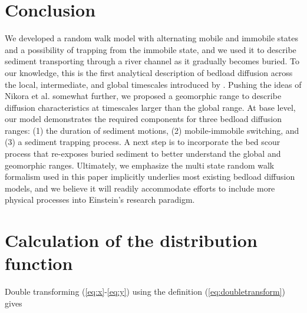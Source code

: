 \documentclass[draft,grl]{agujournal2018}
\begin{document}
\section{Conclusion}
\label{sec:conclusion}
We developed a random walk model with alternating mobile and immobile states and a possibility of trapping from the immobile state, and we used it to describe sediment transporting through a river channel as it gradually becomes buried.
To our knowledge, this is the first analytical description of bedload diffusion across the local, intermediate, and global timescales introduced by \citet{Nikora2001a}.
Pushing the ideas of Nikora et al. somewhat further, we proposed a geomorphic range to describe diffusion characteristics at timescales larger than the global range.
At base level, our model demonstrates the required components for three bedload diffusion ranges: (1) the duration of sediment motions, (2) mobile-immobile switching, and (3) a sediment trapping process.
A next step is to incorporate the bed scour process that re-exposes buried sediment to better understand the global and geomorphic ranges.
Ultimately, we emphasize the multi state random walk formalism used in this paper implicitly underlies most existing bedload diffusion models, and we believe it will readily accommodate efforts to include more physical processes into Einstein's research paradigm.

\appendix

\section{Calculation of the distribution function}
\label{sec:appendixA}
Double transforming (\ref{eq:x}-\ref{eq:y}) using the definition (\ref{eq:doubletransform}) gives
\end{document}
